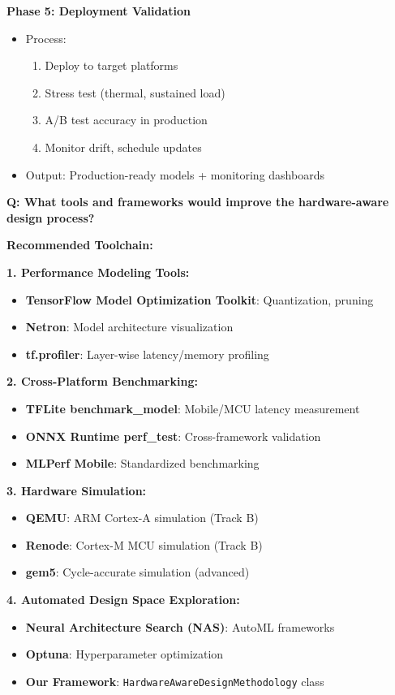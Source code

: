\documentclass[10pt, a4paper]{article}
\begin{document}
\textbf{Phase 5: Deployment Validation}
\begin{itemize}
    \item Process:
    \begin{enumerate}
        \item Deploy to target platforms
        \item Stress test (thermal, sustained load)
        \item A/B test accuracy in production
        \item Monitor drift, schedule updates
    \end{enumerate}
    \item Output: Production-ready models + monitoring dashboards
\end{itemize}

\textbf{Q: What tools and frameworks would improve the hardware-aware design process?}

\textbf{Recommended Toolchain:}

\textbf{1. Performance Modeling Tools:}
\begin{itemize}
    \item \textbf{TensorFlow Model Optimization Toolkit}: Quantization, pruning
    \item \textbf{Netron}: Model architecture visualization
    \item \textbf{tf.profiler}: Layer-wise latency/memory profiling
\end{itemize}

\textbf{2. Cross-Platform Benchmarking:}
\begin{itemize}
    \item \textbf{TFLite benchmark\_model}: Mobile/MCU latency measurement
    \item \textbf{ONNX Runtime perf\_test}: Cross-framework validation
    \item \textbf{MLPerf Mobile}: Standardized benchmarking
\end{itemize}

\textbf{3. Hardware Simulation:}
\begin{itemize}
    \item \textbf{QEMU}: ARM Cortex-A simulation (Track B)
    \item \textbf{Renode}: Cortex-M MCU simulation (Track B)
    \item \textbf{gem5}: Cycle-accurate simulation (advanced)
\end{itemize}

\textbf{4. Automated Design Space Exploration:}
\begin{itemize}
    \item \textbf{Neural Architecture Search (NAS)}: AutoML frameworks
    \item \textbf{Optuna}: Hyperparameter optimization
    \item \textbf{Our Framework}: \texttt{HardwareAwareDesignMethodology} class
\end{itemize}
\end{document}
